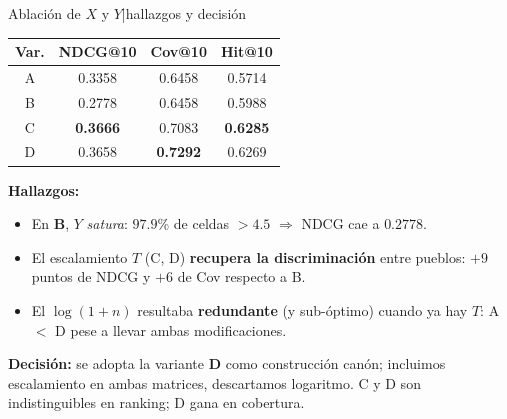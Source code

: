 \documentclass[aspectratio=169,11pt]{beamer}
\begin{document}
\begin{frame}{Ablaci\'on de $X$ y $Y$\;|\;hallazgos y decisi\'on}
	\small
	\centering
	\renewcommand{\arraystretch}{1.08}
	\setlength{\tabcolsep}{8pt}
	\begin{tabular}{c c c c}
		\toprule
		\textbf{Var.} & NDCG@10         & Cov@10          & Hit@10          \\
		\midrule
		A             & 0.3358          & 0.6458          & 0.5714          \\
		B             & 0.2778          & 0.6458          & 0.5988          \\
		C             & \textbf{0.3666} & 0.7083          & \textbf{0.6285} \\
		\rowcolor{cream!50}
		D             & 0.3658          & \textbf{0.7292} & 0.6269          \\
		\bottomrule
	\end{tabular}

	\vspace{0.7em}
	\textbf{Hallazgos:}
	\begin{itemize}\setlength\itemsep{3pt}
		\item En $\mathbf{B}$, $Y$ \emph{satura}: $97.9\%$ de celdas $>4.5$ $\Rightarrow$ NDCG cae a $0.2778$.
		\item El escalamiento $T$ (C, D) \textbf{recupera la discriminaci\'on} entre pueblos: $+9$ puntos de NDCG y $+6$ de Cov respecto a B.
		\item El $\log(1+n)$ resultaba \textbf{redundante} (y sub-\'optimo) cuando ya hay $T$: A $<$ D pese a llevar ambas modificaciones.
	\end{itemize}

	\vspace{0.4em}
	\textbf{Decisi\'on:} se adopta la variante \textbf{D} como construcci\'on can\'on; incluimos escalamiento en ambas matrices, descartamos logaritmo.
	C y D son indistinguibles en ranking; D gana en cobertura.
\end{frame}
\end{document}
